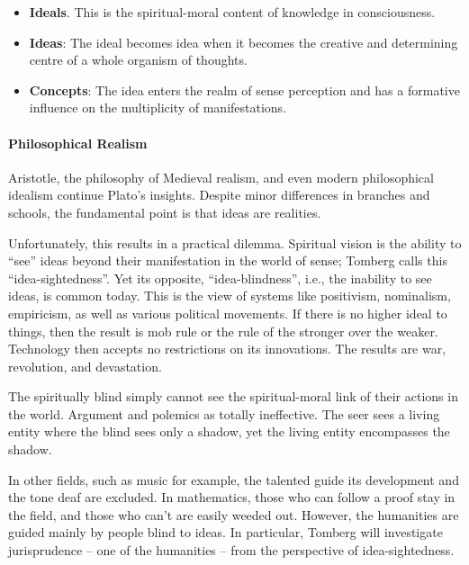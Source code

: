 \begin{itemize}


\item \textbf{Ideals}. This is the spiritual-moral content of knowledge in consciousness.

\item \textbf{Ideas}: The ideal becomes idea when it becomes the creative and determining centre of a whole organism of thoughts.

\item \textbf{Concepts}: The idea enters the realm of sense perception and has a formative influence on the multiplicity of manifestations.
\end{itemize}


\paragraph{Philosophical Realism}


Aristotle, the philosophy of Medieval realism, and even modern philosophical idealism continue Plato's insights. Despite minor differences in branches and schools, the fundamental point is that ideas are realities.

Unfortunately, this results in a practical dilemma. Spiritual vision is the ability to ``see'' ideas beyond their manifestation in the world of sense; Tomberg calls this ``idea-sightedness''. Yet its opposite, ``idea-blindness'', i.e., the inability to see ideas, is common today. This is the view of systems like positivism, nominalism, empiricism, as well as various political movements. If there is no higher ideal to things, then the result is mob rule or the rule of the stronger over the weaker. Technology then accepts no restrictions on its innovations. The results are war, revolution, and devastation.

The spiritually blind simply cannot see the spiritual-moral link of their actions in the world. Argument and polemics as totally ineffective. The seer sees a living entity where the blind sees only a shadow, yet the living entity encompasses the shadow.

In other fields, such as music for example, the talented guide its development and the tone deaf are excluded. In mathematics, those who can follow a proof stay in the field, and those who can't are easily weeded out. However, the humanities are guided mainly by people blind to ideas. In particular, Tomberg will investigate jurisprudence -- one of the humanities -- from the perspective of idea-sightedness.

